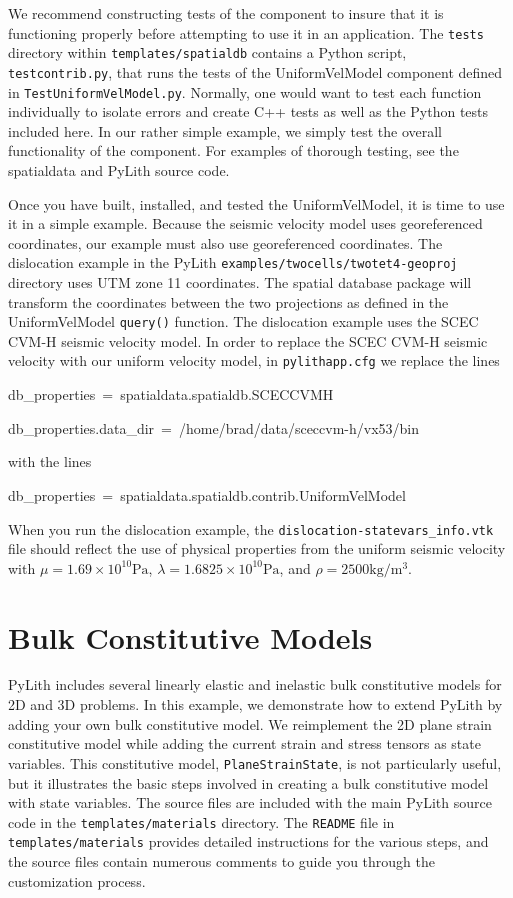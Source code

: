 We recommend constructing tests of the component to insure that it
is functioning properly before attempting to use it in an application.
The \texttt{\small{}tests} directory within \texttt{\small{}templates/spatialdb}
contains a Python script, \texttt{\small{}testcontrib.py}, that runs
the tests of the UniformVelModel component defined in \texttt{\small{}TestUniformVelModel.py}.
Normally, one would want to test each function individually to isolate
errors and create C++ tests as well as the Python tests included here.
In our rather simple example, we simply test the overall functionality
of the component. For examples of thorough testing, see the spatialdata
and PyLith source code.

Once you have built, installed, and tested the UniformVelModel, it
is time to use it in a simple example. Because the seismic velocity
model uses georeferenced coordinates, our example must also use georeferenced
coordinates. The dislocation example in the PyLith \texttt{examples/twocells/twotet4-geoproj}
directory uses UTM zone 11 coordinates. The spatial database package
will transform the coordinates between the two projections as defined
in the UniformVelModel \texttt{query()} function. The dislocation
example uses the SCEC CVM-H seismic velocity model. In order to replace
the SCEC CVM-H seismic velocity with our uniform velocity model, in
\texttt{pylithapp.cfg} we replace the lines
\begin{lyxcode}
db\_properties~=~spatialdata.spatialdb.SCECCVMH

db\_properties.data\_dir~=~/home/brad/data/sceccvm-h/vx53/bin
\end{lyxcode}
with the lines
\begin{lyxcode}
db\_properties~=~spatialdata.spatialdb.contrib.UniformVelModel
\end{lyxcode}
When you run the dislocation example, the \texttt{dislocation-statevars\_info.vtk}
file should reflect the use of physical properties from the uniform
seismic velocity with $\mu=1.69\times10^{10}\mathrm{Pa}$, $\lambda=1.6825\times10^{10}\mathrm{Pa}$,
and $\rho=2500\mathrm{kg/m^{3}}$.


\section{\label{sec:Extending:BulkConstitutiveModels}Bulk Constitutive Models}

PyLith includes several linearly elastic and inelastic bulk constitutive
models for 2D and 3D problems. In this example, we demonstrate how
to extend PyLith by adding your own bulk constitutive model. We reimplement
the 2D plane strain constitutive model while adding the current strain
and stress tensors as state variables. This constitutive model, \texttt{PlaneStrainState},
is not particularly useful, but it illustrates the basic steps involved
in creating a bulk constitutive model with state variables. The source
files are included with the main PyLith source code in the \texttt{templates/materials}
directory. The \texttt{README} file in \texttt{templates/materials}
provides detailed instructions for the various steps, and the source
files contain numerous comments to guide you through the customization
process.

